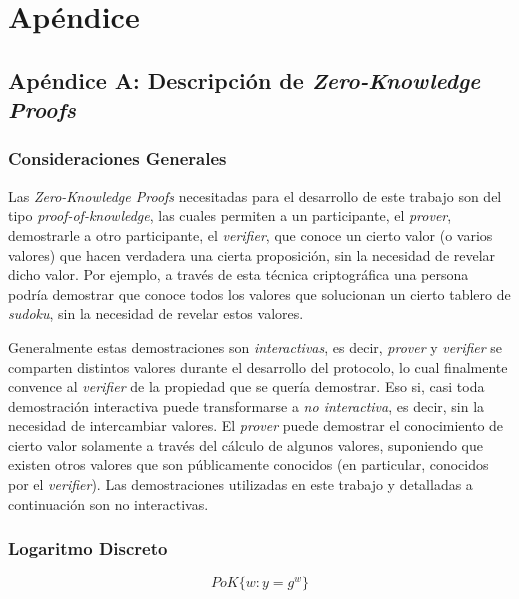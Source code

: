 \chapter{Apéndice}

\section{Apéndice A: Descripción de \emph{Zero-Knowledge Proofs}}\label{apen-a}

\subsection{Consideraciones Generales}

Las \emph{Zero-Knowledge Proofs} necesitadas para el desarrollo de este 
trabajo son del tipo \emph{proof-of-knowledge}, las cuales permiten a un 
participante, el \emph{prover}, demostrarle a otro participante, el \emph{verifier}, que conoce un cierto 
valor (o varios valores) que hacen verdadera una cierta proposición, sin la 
necesidad de revelar dicho valor. Por ejemplo, a través de esta técnica 
criptográfica una persona podría demostrar que conoce todos los 
valores que solucionan un cierto tablero de \emph{sudoku}, sin la necesidad de 
revelar estos valores.

Generalmente estas demostraciones son \emph{interactivas}, es decir, 
\emph{prover} y \emph{verifier} se comparten distintos valores durante el 
desarrollo del protocolo, lo cual finalmente convence al \emph{verifier} de la 
propiedad que se quería demostrar. Eso si, casi toda demostración interactiva puede 
transformarse a \emph{no interactiva}, es decir, sin la necesidad de 
intercambiar valores. El \emph{prover} puede demostrar el conocimiento de 
cierto valor solamente a través del cálculo de algunos valores, suponiendo que 
existen otros valores que son públicamente conocidos (en particular, conocidos 
por el \emph{verifier}). Las demostraciones utilizadas en este trabajo y 
detalladas a continuación son no interactivas.

\subsection{Logaritmo Discreto}

$$PoK\{w: y = g^w\}$$

